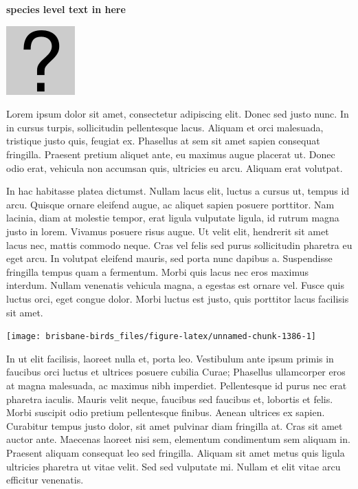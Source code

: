 \documentclass[]{book}
\let\origfigure\figure
\let\endorigfigure\endfigure
\renewenvironment{figure}[1][2] {
  \expandafter\origfigure\expandafter[H]
} {
  \endorigfigure
}
\begin{document}
\textbf{species level text in here}

\begin{figure}
\centering
\includegraphics{assets/missing.png}
\caption{No image for species}
\end{figure}

Lorem ipsum dolor sit amet, consectetur adipiscing elit. Donec sed justo
nunc. In in cursus turpis, sollicitudin pellentesque lacus. Aliquam et
orci malesuada, tristique justo quis, feugiat ex. Phasellus at sem sit
amet sapien consequat fringilla. Praesent pretium aliquet ante, eu
maximus augue placerat ut. Donec odio erat, vehicula non accumsan quis,
ultricies eu arcu. Aliquam erat volutpat.

In hac habitasse platea dictumst. Nullam lacus elit, luctus a cursus ut,
tempus id arcu. Quisque ornare eleifend augue, ac aliquet sapien posuere
porttitor. Nam lacinia, diam at molestie tempor, erat ligula vulputate
ligula, id rutrum magna justo in lorem. Vivamus posuere risus augue. Ut
velit elit, hendrerit sit amet lacus nec, mattis commodo neque. Cras vel
felis sed purus sollicitudin pharetra eu eget arcu. In volutpat eleifend
mauris, sed porta nunc dapibus a. Suspendisse fringilla tempus quam a
fermentum. Morbi quis lacus nec eros maximus interdum. Nullam venenatis
vehicula magna, a egestas est ornare vel. Fusce quis luctus orci, eget
congue dolor. Morbi luctus est justo, quis porttitor lacus facilisis sit
amet.

\begin{figure}
\texttt{[image: brisbane-birds\_files/figure-latex/unnamed-chunk-1386-1]} \caption{insert figure caption}\label{fig:unnamed-chunk-1386}
\end{figure}

In ut elit facilisis, laoreet nulla et, porta leo. Vestibulum ante ipsum
primis in faucibus orci luctus et ultrices posuere cubilia Curae;
Phasellus ullamcorper eros at magna malesuada, ac maximus nibh
imperdiet. Pellentesque id purus nec erat pharetra iaculis. Mauris velit
neque, faucibus sed faucibus et, lobortis et felis. Morbi suscipit odio
pretium pellentesque finibus. Aenean ultrices ex sapien. Curabitur
tempus justo dolor, sit amet pulvinar diam fringilla at. Cras sit amet
auctor ante. Maecenas laoreet nisi sem, elementum condimentum sem
aliquam in. Praesent aliquam consequat leo sed fringilla. Aliquam sit
amet metus quis ligula ultricies pharetra ut vitae velit. Sed sed
vulputate mi. Nullam et elit vitae arcu efficitur venenatis.
\end{document}

